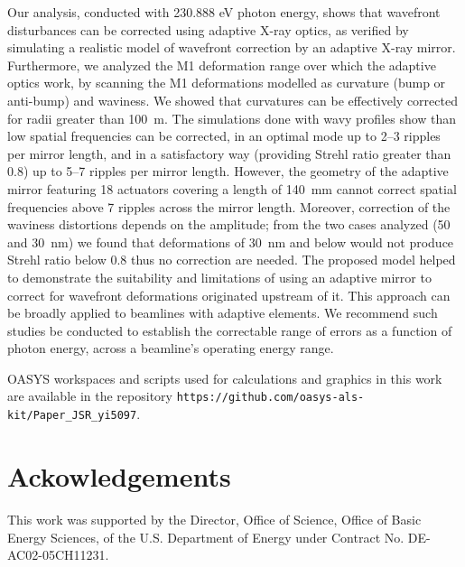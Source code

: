 \documentclass{iucr}
\begin{document}
Our analysis, conducted with 230.888 eV photon energy, shows that wavefront disturbances can be corrected using adaptive X-ray optics, as verified by simulating a realistic model of wavefront correction by an adaptive X-ray mirror. Furthermore, we analyzed the M1 deformation range over which the adaptive optics work, by scanning the M1 deformations modelled as curvature (bump or anti-bump) and waviness. We showed that curvatures can be effectively corrected for radii greater than 100~m. The simulations done with wavy profiles show than low spatial frequencies can be corrected, in an optimal mode up to 2--3 ripples per mirror length, and in a satisfactory way (providing Strehl ratio greater than 0.8) up to 5--7 ripples per mirror length. However, the geometry of the adaptive mirror featuring 18 actuators covering a length of 140~mm cannot correct spatial frequencies above 7 ripples across the mirror length. Moreover, correction of the waviness distortions depends on the amplitude; from the two cases analyzed (50 and 30~nm) we found that deformations of 30~nm and below would not produce Strehl ratio below 0.8 thus no correction are needed. The proposed model helped to demonstrate the suitability and limitations of using an adaptive mirror to correct for wavefront deformations originated upstream of it. This approach can be broadly applied to beamlines with adaptive elements. We recommend such studies be conducted to establish the correctable range of errors as a function of photon energy, across a beamline's operating energy range.

OASYS workspaces and scripts used for calculations and graphics in this work are available in the repository {\tt https://github.com/oasys-als-kit/Paper\_JSR\_yi5097}.

\section{Ackowledgements}       
 
 
This work was supported by the Director, Office of Science, Office of Basic Energy Sciences, of the U.S. Department of Energy under Contract No. DE-AC02-05CH11231.
 
\end{document}
